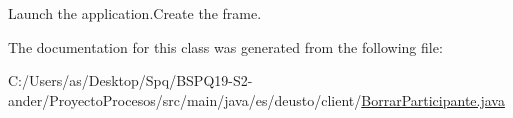 Launch the application.\+Create the frame. 

The documentation for this class was generated from the following file\+:\begin{DoxyCompactItemize}
\item 
C\+:/\+Users/as/\+Desktop/\+Spq/\+B\+S\+P\+Q19-\/\+S2-\/ander/\+Proyecto\+Procesos/src/main/java/es/deusto/client/\mbox{\hyperlink{_borrar_participante_8java}{Borrar\+Participante.\+java}}\end{DoxyCompactItemize}
